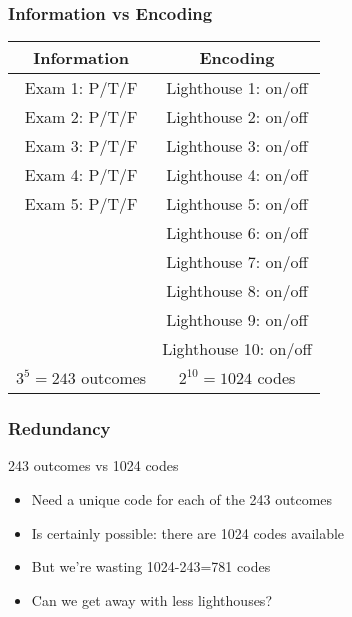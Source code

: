 \documentclass{../ucll-slides}
\begin{document}
\begin{frame}
  \frametitle{Information vs Encoding}
  \begin{center}
    \begin{tabular}{c@{\hspace{1cm}}c}
      \textbf{Information} & \textbf{Encoding} \\
      \toprule
      Exam 1: P/T/F & Lighthouse 1: on/off \\
      Exam 2: P/T/F & Lighthouse 2: on/off \\
      Exam 3: P/T/F & Lighthouse 3: on/off \\
      Exam 4: P/T/F & Lighthouse 4: on/off \\
      Exam 5: P/T/F & Lighthouse 5: on/off \\
                    & Lighthouse 6: on/off \\
                    & Lighthouse 7: on/off \\
                    & Lighthouse 8: on/off \\
                    & Lighthouse 9: on/off \\
                    & Lighthouse 10: on/off \\
      \midrule
      $3^5 = 243$ outcomes & $2^{10} = 1024$ codes
    \end{tabular}
  \end{center}
\end{frame}

\begin{frame}
  \frametitle{Redundancy}
  \begin{center}
    243 outcomes vs 1024 codes
  \end{center}
  \begin{itemize}
    \item Need a unique code for each of the 243 outcomes
    \item Is certainly possible: there are 1024 codes available
    \item But we're wasting 1024-243=781 codes
    \item Can we get away with less lighthouses?
  \end{itemize}
\end{frame}
\end{document}
